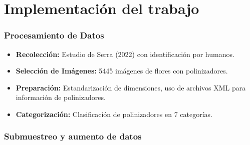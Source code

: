 \section{Implementación del trabajo}

\begin{frame}
    \frametitle{Procesamiento de Datos}
    \vspace*{-1cm}
    \begin{itemize}
        \item \textbf{Recolección:} Estudio de Serra (2022) con identificación por humanos.
        \item \textbf{Selección de Imágenes:} 5445 imágenes de flores con polinizadores.
        \item \textbf{Preparación:} Estandarización de dimensiones, uso de archivos XML para información de polinizadores.
        \item \textbf{Categorización:} Clasificación de polinizadores en 7 categorías.
    \end{itemize}
\end{frame}

\begin{frame}
    \vspace*{-.3cm}
    \begin{center}
    \end{center}
\end{frame}

\begin{frame}
    \vspace*{-.3cm}
    \begin{center}
    \end{center}
\end{frame}

\begin{frame}
    \frametitle{Submuestreo y aumento de datos}
    \vspace*{-.1cm}
    \begin{center}
    \end{center}
\end{frame}

